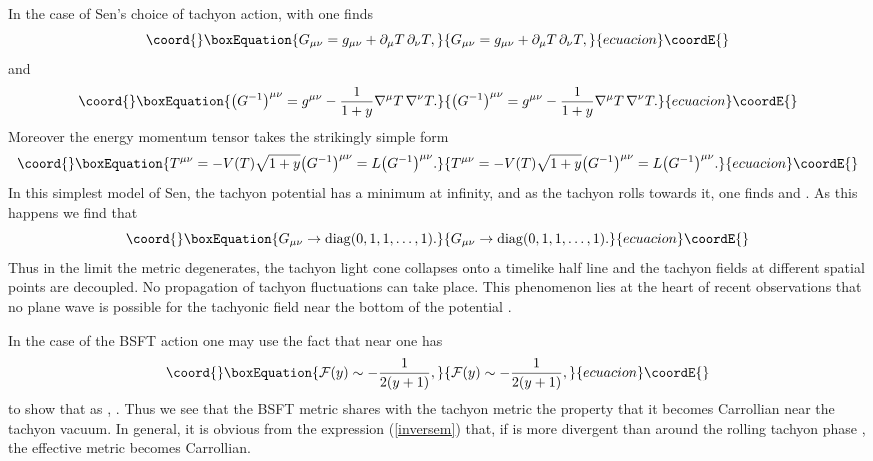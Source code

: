\documentclass[a4paper,12pt]{article}
\begin{document}
In the case of Sen's choice of tachyon action, 
with \coordHE{} 
one finds 
\begin{equation}\coord{}\boxEquation{
G_{\mu \nu} = g_{\mu \nu}  + \partial _\mu T \thinspace \partial
_\nu T, 
}{
G_{\mu \nu} = g_{\mu \nu}  + \partial _\mu T \thinspace \partial
_\nu T, 
}{ecuacion}\coordE{}\end{equation} 
and 
\begin{equation}\coord{}\boxEquation{ 
\bigl ( G^{-1} \bigr ) ^{\mu \nu} = g^{\mu
\nu} -\frac{1}{1+y} \nabla^\mu T \thinspace \nabla^\nu T.
 }{ 
\bigl ( G^{-1} \bigr ) ^{\mu \nu} = g^{\mu
\nu} -\frac{1}{1+y} \nabla^\mu T \thinspace \nabla^\nu T.
 }{ecuacion}\coordE{}\end{equation}
Moreover the energy momentum tensor takes the
strikingly simple form 
\begin{equation}\coord{}\boxEquation{ 
T^{\mu \nu} = -V(T) \sqrt {1+y} \bigl
( G^{-1} \bigr )  ^{\mu \nu}= L \bigl ( G^{-1}  \bigr ) ^{\mu \nu}
. }{ 
T^{\mu \nu} = -V(T) \sqrt {1+y} \bigl
( G^{-1} \bigr )  ^{\mu \nu}= L \bigl ( G^{-1}  \bigr ) ^{\mu \nu}
. }{ecuacion}\coordE{}\end{equation}
In this simplest model of Sen,
the tachyon potential \coordHE{}
has a minimum at infinity, and as the tachyon rolls towards it,
one finds \coordHE{} and \coordHE{}. 
As
this happens we find that 
\begin{equation}\coord{}\boxEquation{ 
G_{\mu \nu} \rightarrow {\rm diag }
(0,1,1, \dots, 1 ). 
}{ 
G_{\mu \nu} \rightarrow {\rm diag }
(0,1,1, \dots, 1 ). 
}{ecuacion}\coordE{}\end{equation} 
Thus in the limit the metric degenerates,
the tachyon light cone collapses onto a timelike half line and
the tachyon fields at different spatial points are decoupled. No
propagation of tachyon fluctuations can take place. 
This phenomenon lies at the heart of recent observations that
no plane wave is possible for the tachyonic field near the bottom of the 
potential \coordHE{}.

In the case of the BSFT action one may use the fact that
near \coordHE{} one has \cite{Terashima}
\begin{equation}\coord{}\boxEquation{
{\cal F}(y) \sim - \frac{1}{2(y+1)},
\label{limitt}
}{
{\cal F}(y) \sim - \frac{1}{2(y+1)},
}{ecuacion}\coordE{}\end{equation}
to show that as \coordHE{}, 
\coordHE{}.
Thus we see that the 
BSFT metric shares with the tachyon metric \coordHE{} the property
that it becomes Carrollian near the tachyon vacuum. In general, it is
obvious from the expression (\ref{inversem}) that, if \coordHE{} is more
divergent than \coordHE{} around the rolling tachyon phase \coordHE{}, the
effective metric \coordHE{} becomes Carrollian.
\end{document}
